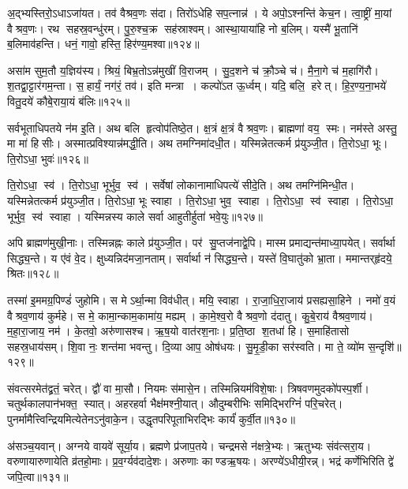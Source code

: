 अ॒द्भ्यस्तिरो॒ऽधाऽजा॑यत। तव॑ वैश्रव॒णः स॑दा। 
तिरो॑ऽधेहि सप॒त्नान्न॑। ये अपो॒ऽश्नन्ति॑ केच॒न। 
त्वा॒ष्ट्रीं मा॒यां वैश्रव॒णः। रथ सहस्र॒वन्धु॑रम्‌। 
पु॒रु॒श्च॒क्र सह॑स्राश्वम्‌। आस्था॒याया॑हि नो ब॒लिम्‌। 
यस्मै॑ भू॒तानि॑ ब॒लिमाव॑हन्ति। धनं॒ गावो॒ हस्ति॒ हिर॑ण्य॒मश्वा\sn{}॥१२४॥


असा॑म सुम॒तौ य॒ज्ञिय॑स्य। श्रियं॒ बिभ्र॒तोऽन्न॑मुखीं वि॒राजम्‌। 
सु॒द॒\ar{}शने च॑ क्रौ॒ञ्चे च॑। मै॒ना॒गे च॑ म॒हागि॑रौ। 
श॒तद्वा॒ट्टार॑गम॒न्ता। स॒हार्यं॒ नग॑रं॒ तव॑। 
इति मन्त्रा। कल्पो॑ऽत ऊ॒र्ध्वम्‌। यदि॒ बलि॒ हरेत्‌। 
हि॒र॒ण्य॒ना॒भये॑ वितु॒दये॑ कौबे॒राया॒यं ब॑लिः॥१२५॥


सर्वभूताधिपतये न॑म इ॒ति। अथ बलि हृत्वोप॑तिष्ठे॒त। 
क्ष॒त्रं क्ष॒त्रं वैश्रव॒णः। ब्राह्मणा॑ वय॒ स्मः। 
नम॑स्ते अस्तु॒ मा मा॑ हिसीः। अस्मात्प्रविश्यान्न॑मद्धी॒ति। 
अथ तमग्निमा॑दधी॒त। यस्मिन्नेतत्कर्म प्र॑युञ्जी॒त। 
ति॒रोऽधा॒ भूः। ति॒रोऽधा॒ भुवः॑॥१२६॥


ति॒रोऽधा॒ स्व॑। ति॒रोऽधा॒ भूर्भुव॒ स्व॑। 
सर्वेषां लोकानामाधिपत्ये॑ सीदे॒ति। अथ तमग्नि॑मिन्धी॒त। 
यस्मिन्नेतत्कर्म प्र॑युञ्जी॒त। ति॒रोऽधा॒ भूः स्वाहा। 
ति॒रोऽधा॒ भुव॒ स्वाहा। ति॒रोऽधा॒ स्व॑ स्वाहा। 
ति॒रोऽधा॒ भूर्भुव॒ स्व॑ स्वाहा। 
यस्मिन्नस्य काले सर्वा आहुतीर्\mbox{}\hspace{-0.5ex}हुता॑ भवे॒युः॥१२७॥


अपि ब्राह्मण॑मुखी॒नाः। तस्मिन्नह्नः काले प्र॑युञ्जी॒त। 
पर॑ सु॒प्तज॑नाद्वे॒पि। मास्म प्रमाद्यन्त॑माध्या॒पयेत्‌। 
सर्वार्था सिद्ध्य॒न्ते। य ए॑वं वे॒द। 
क्षुध्यन्निद॑मजा॒नताम्‌। सर्वार्था न॑ सिद्ध्य॒न्ते। 
यस्ते॑ वि॒घातु॑को भ्रा॒ता। ममान्तर्‌हृ॑दये॒ श्रितः॥१२८॥


तस्मा॑ इ॒ममग्र॒पिण्डं॑ जुहोमि। स मेऽर्था॒न्मा विव॑धीत्‌। 
मयि॒ स्वाहा। रा॒जा॒धि॒रा॒जाय॑ प्रसह्यसा॒हिने। 
नमो॑ व॒यं वैश्रव॒णाय॑ कुर्महे। स मे॒ कामा॒न्काम॒कामा॑य॒ मह्यम्‌। 
का॒मे॒श्व॒रो वैश्रव॒णो द॑दातु। कु॒बे॒राय॑ वैश्रव॒णाय॑। 
म॒हा॒रा॒जाय॒ नम॑। के॒तवो॒ अरु॑णासश्च। 
ऋ॒ष॒यो वात॑रश॒नाः। प्र॒ति॒ष्ठा श॒तधा॑ हि। 
स॒माहि॑तासो सहस्र॒धाय॑सम्‌। शि॒वा नः॒ शन्त॑मा भवन्तु। 
दि॒व्या आप॒ ओष॑धयः। सु॒मृ॒डी॒का सर॑स्वति। 
मा ते॒ व्यो॑म स॒न्दृशि॑॥१२९॥\anuvakamend


संवत्सरमेत॑द्व्रतं॒ चरेत्‌। द्वौ॑ वा मा॒सौ। 
नियमः स॑मासे॒न। तस्मिन्नियम॑विशे॒षाः। 
त्रिषवणमुदको॑पस्प॒र्शी। चतुर्थकालपान॑भक्त॒ स्यात्‌। 
अहरहर्वा भैक्ष॑मश्नी॒यात्‌। औदुम्बरीभिः समिद्भिरग्निं॑ परि॒चरेत्‌। 
पुनर्मामैत्त्विन्द्रियमित्येतेनऽनु॑वाके॒न। उद्धृतपरिपूताभि\-रद्भिः कार्यं॑ कुर्वी॒त॥१३०॥


अ॑सञ्च॒यवान्‌। अग्नये वायवे॑ सूर्या॒य। 
ब्रह्मणे प्र॑जाप॒तये। चन्द्रमसे न॑क्षत्रे॒भ्यः। 
ऋतुभ्यः संव॑त्सरा॒य। वरुणायारुणायेति व्र॑तहो॒माः। 
प्र॒व॒र्ग्यव॑दादे॒शः। अरुणाः काण्डऋ॒षयः। 
अरण्ये॑ऽधीयी॒रन्न्‌। भद्रं कर्णेभिरिति द्वे॑ जपि॒त्वा॥१३१॥


